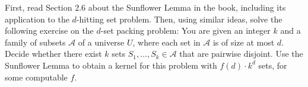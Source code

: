 \documentclass{uebung_cs}
\begin{document}
\begin{exercise} %
  First, read Section 2.6 about the Sunflower Lemma in the book, including its application to the $d$-hitting set problem.
  Then, using similar ideas, solve the following exercise on the $d$-set packing problem:
  You are given an integer $k$ and a family of subsets $\mathcal{A}$ of a universe $U$, where each set in $\mathcal{A}$ is of size at most $d$. Decide whether there exist $k$ sets $S_1,\ldots,S_k \in \mathcal{A}$ that are pairwise disjoint.
  Use the Sunflower Lemma to obtain a kernel for this problem with $f(d)\cdot k^d$ sets, for some computable $f$.
\end{exercise}
\end{document}
